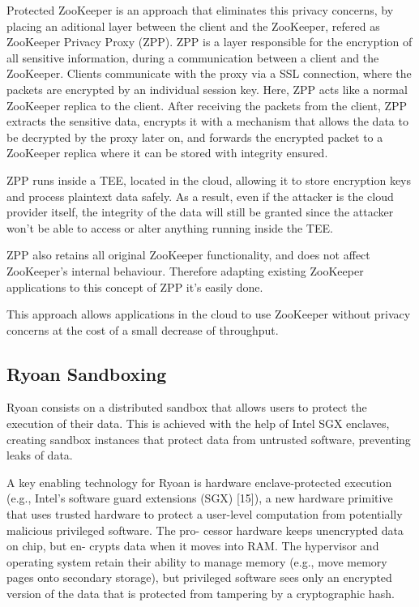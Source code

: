 \begin{itemize}
Protected ZooKeeper \cite{protectedZooKeeper} is an approach that eliminates this privacy concerns, by placing an aditional layer between the client and the ZooKeeper, refered as ZooKeeper Privacy Proxy (ZPP). ZPP is a layer responsible for the encryption of all sensitive information, during a communication between a client and the ZooKeeper. 
Clients communicate with the proxy via a SSL connection, where the packets are encrypted by an individual session key. Here, ZPP acts like a normal ZooKeeper replica to the client. 
After receiving the packets from the client, ZPP extracts the sensitive data, encrypts it with a mechanism that allows the data to be decrypted by the proxy later on, and forwards the encrypted packet to a ZooKeeper replica where it can be stored with integrity ensured.
 
ZPP runs inside a TEE, located in the cloud, allowing it to store encryption keys and process plaintext data safely. As a result, even if the attacker is the cloud provider itself, the integrity of the data will still be granted since the attacker won't be able to access or alter anything running inside the TEE.

ZPP also retains all original ZooKeeper functionality, and does not affect ZooKeeper's internal behaviour. Therefore adapting existing ZooKeeper applications to this concept of ZPP it's easily done.

This approach allows applications in the cloud to use ZooKeeper without privacy concerns at the cost of a small decrease of throughput.

\subsection{Ryoan Sandboxing}

Ryoan consists on a distributed sandbox that allows users to protect the execution of their data. This is achieved with the help of Intel SGX enclaves, creating sandbox instances that protect data from untrusted software, preventing leaks of data. 



A key enabling technology for Ryoan is hardware
enclave-protected execution (e.g., Intel’s software guard
extensions (SGX) [15]), a new hardware primitive that
uses trusted hardware to protect a user-level computation
from potentially malicious privileged software. The pro-
cessor hardware keeps unencrypted data on chip, but en-
crypts data when it moves into RAM. The hypervisor and
operating system retain their ability to manage memory
(e.g., move memory pages onto secondary storage), but
privileged software sees only an encrypted version of the
data that is protected from tampering by a cryptographic
hash.


\end{itemize}
